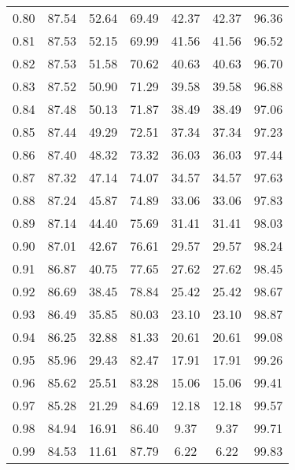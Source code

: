 \begin{tabular}{|c|c|c|c|c|c|c|}
      0.80 &     87.54 &     52.64 &      69.49 &   42.37 &      42.37 &         96.36 \\
      0.81 &     87.53 &     52.15 &      69.99 &   41.56 &      41.56 &         96.52 \\
      0.82 &     87.53 &     51.58 &      70.62 &   40.63 &      40.63 &         96.70 \\
      0.83 &     87.52 &     50.90 &      71.29 &   39.58 &      39.58 &         96.88 \\
      0.84 &     87.48 &     50.13 &      71.87 &   38.49 &      38.49 &         97.06 \\
      0.85 &     87.44 &     49.29 &      72.51 &   37.34 &      37.34 &         97.23 \\
      0.86 &     87.40 &     48.32 &      73.32 &   36.03 &      36.03 &         97.44 \\
      0.87 &     87.32 &     47.14 &      74.07 &   34.57 &      34.57 &         97.63 \\
      0.88 &     87.24 &     45.87 &      74.89 &   33.06 &      33.06 &         97.83 \\
      0.89 &     87.14 &     44.40 &      75.69 &   31.41 &      31.41 &         98.03 \\
      0.90 &     87.01 &     42.67 &      76.61 &   29.57 &      29.57 &         98.24 \\
      0.91 &     86.87 &     40.75 &      77.65 &   27.62 &      27.62 &         98.45 \\
      0.92 &     86.69 &     38.45 &      78.84 &   25.42 &      25.42 &         98.67 \\
      0.93 &     86.49 &     35.85 &      80.03 &   23.10 &      23.10 &         98.87 \\
      0.94 &     86.25 &     32.88 &      81.33 &   20.61 &      20.61 &         99.08 \\
      0.95 &     85.96 &     29.43 &      82.47 &   17.91 &      17.91 &         99.26 \\
      0.96 &     85.62 &     25.51 &      83.28 &   15.06 &      15.06 &         99.41 \\
      0.97 &     85.28 &     21.29 &      84.69 &   12.18 &      12.18 &         99.57 \\
      0.98 &     84.94 &     16.91 &      86.40 &    9.37 &       9.37 &         99.71 \\
      0.99 &     84.53 &     11.61 &      87.79 &    6.22 &       6.22 &         99.83 \\
\bottomrule
\end{tabular}
